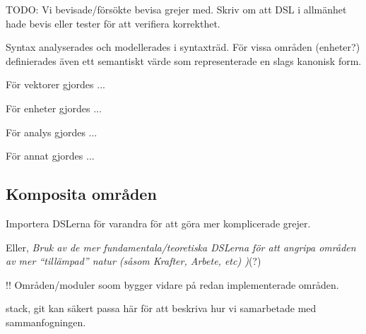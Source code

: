 \begin{binge}
\begin{draft}
    TODO: Vi bevisade/försökte bevisa grejer med. Skriv om att DSL i
    allmänhet hade bevis eller tester för att verifiera korrekthet.
  \end{draft}

  Syntax analyserades och modellerades i syntaxträd. För vissa områden
  (enheter?) definierades även ett semantiskt värde som representerade
  en slags kanonisk form.

  För vektorer gjordes ...

  För enheter gjordes ...

  För analys gjordes ...

  För annat gjordes ...

  \subsection{Komposita områden}

  Importera DSLerna för varandra för att göra mer komplicerade grejer.

  Eller, \emph{Bruk av de mer fundamentala/teoretiska DSLerna för att
    angripa områden av mer ``tillämpad'' natur (såsom Krafter, Arbete,
    etc) )}(?)

  !! Områden/moduler soom bygger vidare på redan implementerade områden.

  stack, git kan säkert passa här för att beskriva hur vi samarbetade
  med sammanfogningen.

\end{binge}

